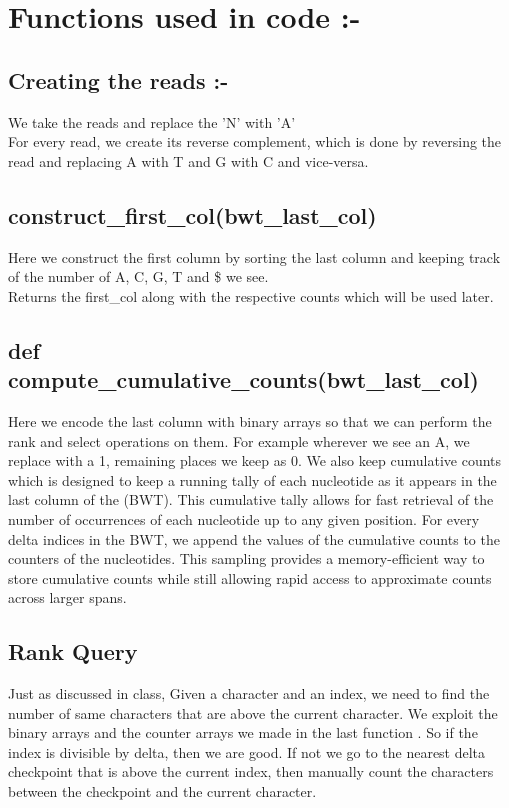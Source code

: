 \documentclass{article}
\begin{document}
\section{Functions used in code :-}
\subsection{Creating the reads :- }
We take the reads and replace the 'N' with 'A'\\
For every read, we create its reverse complement, which is done by reversing the read and replacing A with T and G with C and vice-versa.
\subsection{construct\_first\_col(bwt\_last\_col)}
Here we construct the first column by sorting the last column and keeping track of the number of A, C, G, T and \$ we see.\\
Returns the first\_col along with the respective counts which will be used later.
\subsection{def compute\_cumulative\_counts(bwt\_last\_col)}
Here we encode the last column with binary arrays so that we can perform the rank and select operations on them. For example wherever we see an A, we replace with a 1, remaining places we keep as 0. We also keep cumulative counts which is designed to keep a running tally of each nucleotide as it appears in the last column of the (BWT). This cumulative tally allows for fast retrieval of the number of occurrences of each nucleotide up to any given position. For every delta indices in the BWT, we append the values of the cumulative counts to the counters of the nucleotides. This sampling provides a memory-efficient way to store cumulative counts while still allowing rapid access to approximate counts across larger spans.
\subsection{Rank Query}
Just as discussed in class, Given a character and an index, we need to find the number of same characters that are above the current character. We exploit the binary arrays and the counter arrays we made in the last function . So if the index is divisible by delta, then we are good. If not we go to the nearest delta checkpoint that is above the current index, then manually count the characters between the checkpoint and the current character.
\end{document}
